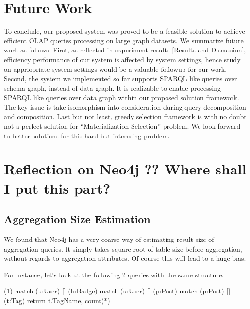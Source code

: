 \section{Future Work}
To conclude, our proposed system was proved to be a feasible solution to achieve efficient OLAP queries processing on large graph datasets. We summarize future work as follows. First, as reflected in experiment results \ref{Results and Discussion}, efficiency performance of our system is affected by system settings, hence study on appriopriate system settings would be a valuable followup for our work. Second, the system we implemented so far supports SPARQL like queries over schema graph, instead of data graph. It is realizable to enable processing SPARQL like queries over data graph within our proposed solution framework. The key issue is take isomorphism into consideration during query decomposition and composition. Last but not least, greedy selection framework is with no doubt not a perfect solution for ``Materialization Selection'' problem. We look forward to better solutions for this hard but interesing problem.

\section{Reflection on Neo4j ?? Where shall I put this part?}
\subsection{Aggregation Size Estimation}
We found that Neo4j has a very coarse way of estimating result size of aggregation queries. It simply takes square root of table size before aggregation, without regards to aggregation attributes. Of course this will lead to a huge bias. 

For instance, let’s look at the following 2 queries with the same structure:

(1) match (u:User)-[]-(b:Badge)  match (u:User)-[]-(p:Post)  match (p:Post)-[]-(t:Tag)  return  t.TagName, count(*)

